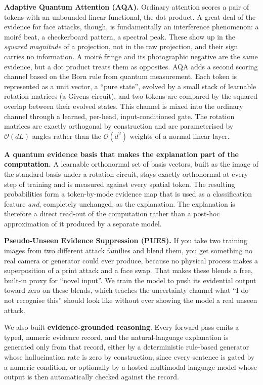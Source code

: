\documentclass[conference]{IEEEtran}
\begin{document}
\textbf{Adaptive Quantum Attention (AQA).} Ordinary attention scores a pair of
tokens with an unbounded linear functional, the dot product. A great deal of the
evidence for face attacks, though, is fundamentally an interference phenomenon: a
moir\'e beat, a checkerboard pattern, a spectral peak. These show up in the
\emph{squared magnitude} of a projection, not in the raw projection, and their sign
carries no information. A moir\'e fringe and its photographic negative are the same
evidence, but a dot product treats them as opposites. AQA adds a second scoring
channel based on the Born rule from quantum measurement. Each token is represented
as a unit vector, a ``pure state'', evolved by a small stack of learnable rotation
matrices (a Givens circuit), and two tokens are compared by the squared overlap
between their evolved states. This channel is mixed into the ordinary channel
through a learned, per-head, input-conditioned gate. The rotation matrices are
exactly orthogonal by construction and are parameterised by $\mathcal{O}(dL)$ angles
rather than the $\mathcal{O}(d^{2})$ weights of a normal linear layer.

\textbf{A quantum evidence basis that makes the explanation part of the
computation.} A learnable orthonormal set of basis vectors, built as the image of
the standard basis under a rotation circuit, stays exactly orthonormal at every
step of training and is measured against every spatial token. The resulting
probabilities form a token-by-mode evidence map that is used as a classification
feature \emph{and}, completely unchanged, as the explanation. The explanation is
therefore a direct read-out of the computation rather than a post-hoc approximation
of it produced by a separate model.

\textbf{Pseudo-Unseen Evidence Suppression (PUES).} If you take two training images
from two different attack families and blend them, you get something no real camera
or generator could ever produce, because no physical process makes a superposition
of a print attack and a face swap. That makes these blends a free, built-in proxy
for ``novel input''. We train the model to push its evidential output
toward zero on these blends, which teaches the uncertainty channel what ``I do not
recognise this'' should look like without ever showing the model a real unseen
attack.

We also built \textbf{evidence-grounded reasoning}. Every forward pass emits a
typed, numeric evidence record, and the natural-language explanation is generated
only from that record, either by a deterministic rule-based generator whose
hallucination rate is zero by construction, since every sentence is gated by a
numeric condition, or optionally by a hosted multimodal language model whose output
is then automatically checked against the record.
\end{document}
